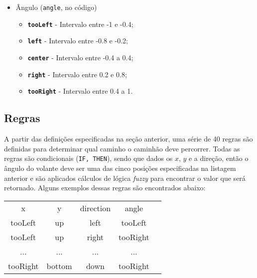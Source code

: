 \documentclass{article}
\begin{document}
        \begin{itemize}
            \item Ângulo (\texttt{angle}, no código)
            \begin{itemize}
                \item \texttt{\textbf{tooLeft}} - Intervalo entre -1 e -0.4;
                \item \texttt{\textbf{left}} - Intervalo entre -0.8 e -0.2;
                \item \texttt{\textbf{center}} - Intervalo entre -0.4 a 0.4;
                \item \texttt{\textbf{right}} - Intervalo entre 0.2 e 0.8;
                \item \texttt{\textbf{tooRight}} - Intervalo entre 0.4 a 1.
            \end{itemize}
        \end{itemize}
    
    \subsection*{Regras}
        A partir das definições especificadas na seção anterior, uma série de
        40 regras são definidas para determinar qual caminho o caminhão deve
        percorrer. Todas as regras são condicionais (\texttt{IF, THEN}), sendo
        que dados os $x$, $y$ e a direção, então o ângulo do volante deve ser
        uma das cinco posições especificadas na listagem anterior e são
        aplicados cálculos de lógica \textit{fuzzy} para encontrar o valor que
        será retornado. Alguns exemplos dessas regras são encontrados abaixo:
        
        \begin{center}
            \begin{tabular}{c c c c c}
                \hline
                 x & y & direction & angle \\
                 tooLeft & up & left & tooLeft \\
                 tooLeft & up & right & tooRight \\
                 ... & ... & ... & ... \\
                 tooRight & bottom & down & tooRight \\
                 
                \hline
            \end{tabular}
        \end{center}
        
\end{document}
